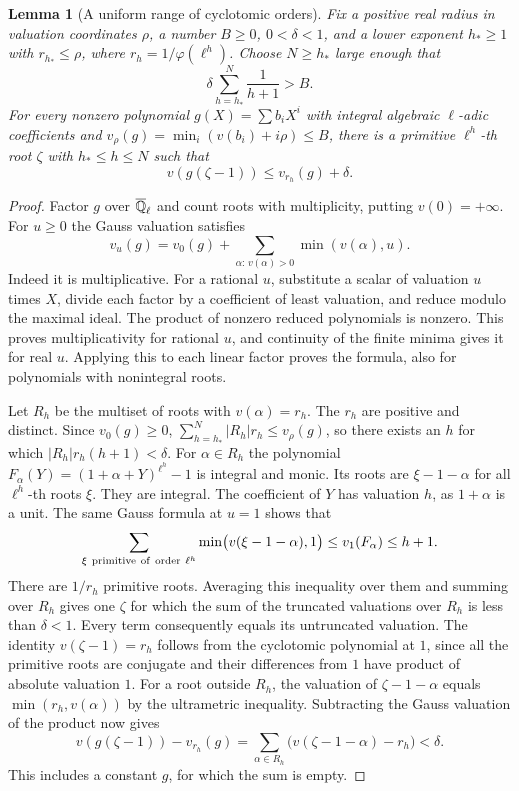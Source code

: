 \documentclass[a4paper,11pt]{article}
\newtheorem{lemma}[proposition]{Lemma}
\theoremstyle{definition}
\theoremstyle{remark}
\numberwithin{equation}{section}
\begin{document}
\begin{lemma}[A uniform range of cyclotomic orders]\leavevmode
\label{lem:gausscircle726}
Fix a positive real radius in valuation coordinates \(\rho\), a number
\(B\ge0\), \(0<\delta<1\), and a lower exponent \(h_*\ge1\) with
\(r_{h_*}\le\rho\), where \(r_h=1/\varphi(\ell^h)\). Choose \(N\ge h_*\)
large enough that
\[
                   \delta\sum_{h=h_*}^{N}\frac{1}{h+1}> B .
\]
For every nonzero polynomial \(g(X)=\sum b_i X^i\) with integral
algebraic \(\ell\)-adic coefficients and
\(v_\rho(g)=\min_i(v(b_i)+i\rho)\le B\), there is a primitive
\(\ell^h\)-th root \(\zeta\) with \(h_*\le h\le N\) such that
\[
                   v(g(\zeta-1))\le v_{r_h}(g)+\delta .
\]
\end{lemma}
\begin{proof}
Factor \(g\) over \(\overline{\mathbb Q}_\ell\) and count roots with multiplicity,
putting \(v(0)=+\infty\). For \(u\ge0\) the Gauss valuation satisfies
\[
 v_u(g)=v_0(g)+\sum_{\alpha:\,v(\alpha)>0}\min(v(\alpha),u).
\]
Indeed it is multiplicative. For a rational \(u\), substitute a scalar
of valuation \(u\) times \(X\), divide each factor by a coefficient
of least valuation, and reduce modulo the maximal ideal. The product
of nonzero reduced polynomials is nonzero. This proves multiplicativity
for rational \(u\), and continuity of the finite minima gives it for
real \(u\). Applying this to each linear factor proves the formula,
also for polynomials with nonintegral roots.

Let \(R_h\) be the multiset of roots with \(v(\alpha)=r_h\).
The \(r_h\) are positive and distinct. Since \(v_0(g)\ge0\),
\(\sum_{h=h_*}^{N}|R_h|r_h\le v_\rho(g)\), so there exists an \(h\)
for which \(|R_h|r_h(h+1)<\delta\). For \(\alpha\in R_h\) the
polynomial \(F_\alpha(Y)=(1+\alpha+Y)^{\ell^h}-1\) is integral and
monic. Its roots are \(\xi-1-\alpha\) for all \(\ell^h\)-th roots
\(\xi\). They are integral. The coefficient of \(Y\) has valuation
\(h\), as \(1+\alpha\) is a unit. The same Gauss formula at \(u=1\)
shows that
\[
   \sum_{\xi\ {\rm primitive\ of\ order}\ \ell^h}
           \min\bigl(v(\xi-1-\alpha),1\bigr)
                         \le v_1(F_\alpha)\le h+1.
\]
There are \(1/r_h\) primitive roots. Averaging this inequality over
them and summing over \(R_h\) gives one \(\zeta\) for which the sum of
the truncated valuations over \(R_h\) is less than \(\delta<1\).
Every term consequently equals its untruncated valuation.
The identity \(v(\zeta-1)=r_h\) follows from the cyclotomic polynomial
at \(1\), since all the primitive roots are conjugate and their
differences from \(1\) have product of absolute valuation \(1\).
For a root outside \(R_h\), the valuation of \(\zeta-1-\alpha\)
equals \(\min(r_h,v(\alpha))\) by the ultrametric inequality.
Subtracting the Gauss valuation of the product now gives
\[
   v(g(\zeta-1))-v_{r_h}(g)
       =\sum_{\alpha\in R_h}\bigl(v(\zeta-1-\alpha)-r_h\bigr)<\delta .
\]
This includes a constant \(g\), for which the sum is empty.
\end{proof}
\end{document}
